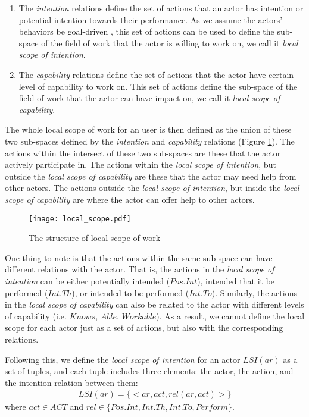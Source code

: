 \begin{enumerate}
	\item The \emph{intention} relations define the set of actions that an actor has intention or potential intention towards their performance. As we assume the actors' behaviors be goal-driven \cite{nardi1996context}, this set of actions can be used to define the sub-space of the field of work that the actor is willing to work on, we call it \emph{local scope of intention}.
	\item The \emph{capability} relations define the set of actions that the actor have certain level of capability to work on. This set of actions define the sub-space of the field of work that the actor can have impact on, we call it \emph{local scope of capability}.
\end{enumerate}

The whole local scope of work for an user is then defined as the union of these two sub-spaces defined by the \emph{intention} and \emph{capability} relations (Figure \ref{fig:local_scope}). The actions within the intersect of these two sub-spaces are these that the actor actively participate in. The actions within the \emph{local scope of intention}, but outside the \emph{local scope of capability} are these that the actor may need help from other actors. The actions outside the \emph{local scope of intention}, but inside the \emph{local scope of capability} are where the actor can offer help to other actors.

\begin{figure}[htbp] %
   \centering
   \texttt{[image: local\_scope.pdf]} 
   \caption{The structure of local scope of work}
   \label{fig:local_scope}
\end{figure}

One thing to note is that the actions within the same sub-space can have different relations with the actor. That is, the actions in the \emph{local scope of intention} can be either potentially intended ($Pos.Int$), intended that it be performed ($Int.Th$), or intended to be performed ($Int.To$). Similarly, the actions in the \emph{local scope of capability} can also be related to the actor with different levels of capability (i.e. $Knows$, $Able$, $Workable$). As a result, we cannot define the local scope for each actor just as a set of actions, but also with the corresponding relations.

Following this, we define the \emph{local scope of intention} for an actor $LSI(ar)$ as a set of tuples, and each tuple includes three elements: the actor, the action, and the intention relation between them:
\begin{align*} 
	LSI(ar) = \{<ar, act, rel(ar, act)>\}
\end{align*}
where $act\in ACT$ and $rel\in \{Pos.Int, Int.Th, Int.To, Perform\}$.

